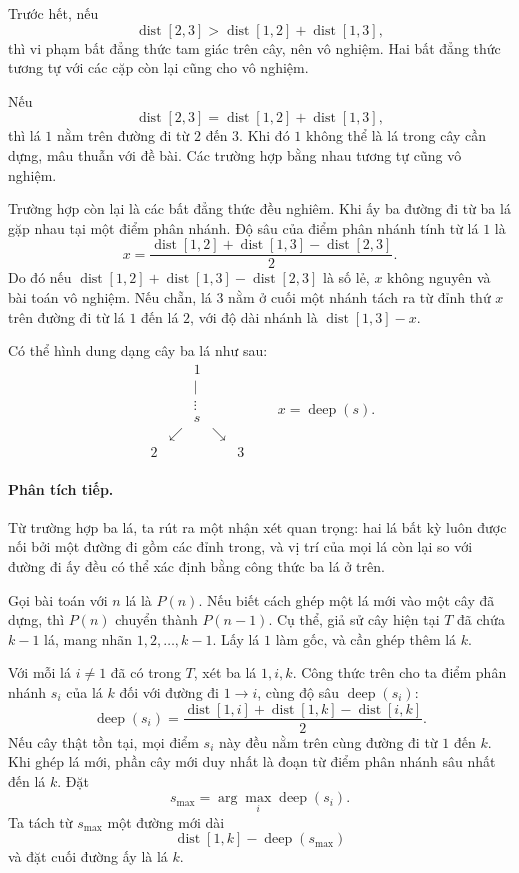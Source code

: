 \documentclass[11pt]{article}
\newcommand{\dist}{\operatorname{dist}}
\newcommand{\deep}{\operatorname{deep}}
\begin{document}
Trước hết, nếu
\[
  \dist[2,3]>\dist[1,2]+\dist[1,3],
\]
thì vi phạm bất đẳng thức tam giác trên cây, nên vô nghiệm. Hai bất đẳng thức
tương tự với các cặp còn lại cũng cho vô nghiệm.

Nếu
\[
  \dist[2,3]=\dist[1,2]+\dist[1,3],
\]
thì lá \(1\) nằm trên đường đi từ \(2\) đến \(3\). Khi đó \(1\) không thể là lá
trong cây cần dựng, mâu thuẫn với đề bài. Các trường hợp bằng nhau tương tự
cũng vô nghiệm.

Trường hợp còn lại là các bất đẳng thức đều nghiêm. Khi ấy ba đường đi từ ba
lá gặp nhau tại một điểm phân nhánh. Độ sâu của điểm phân nhánh tính từ lá
\(1\) là
\[
  x=\frac{\dist[1,2]+\dist[1,3]-\dist[2,3]}{2}.
\]
Do đó nếu \(\dist[1,2]+\dist[1,3]-\dist[2,3]\) là số lẻ, \(x\) không nguyên
và bài toán vô nghiệm. Nếu chẵn, lá \(3\) nằm ở cuối một nhánh tách ra từ
đỉnh thứ \(x\) trên đường đi từ lá \(1\) đến lá \(2\), với độ dài nhánh là
\(\dist[1,3]-x\).

Có thể hình dung dạng cây ba lá như sau:
\[
\begin{array}{ccccc}
&&1&&\\
&&|&&\\
&&\vdots&&\\
&&s&&\\
&\swarrow&&\searrow&\\
2&&&&3
\end{array}
\qquad
x=\deep(s).
\]

\paragraph{Phân tích tiếp.}
Từ trường hợp ba lá, ta rút ra một nhận xét quan trọng: hai lá bất kỳ luôn
được nối bởi một đường đi gồm các đỉnh trong, và vị trí của mọi lá còn lại
so với đường đi ấy đều có thể xác định bằng công thức ba lá ở trên.

Gọi bài toán với \(n\) lá là \(P(n)\). Nếu biết cách ghép một lá mới vào một
cây đã dựng, thì \(P(n)\) chuyển thành \(P(n-1)\). Cụ thể, giả sử cây hiện tại
\(T\) đã chứa \(k-1\) lá, mang nhãn \(1,2,\ldots,k-1\). Lấy lá \(1\) làm gốc,
và cần ghép thêm lá \(k\).

Với mỗi lá \(i\ne 1\) đã có trong \(T\), xét ba lá \(1,i,k\). Công thức trên
cho ta điểm phân nhánh \(s_i\) của lá \(k\) đối với đường đi \(1\to i\), cùng
độ sâu \(\deep(s_i)\):
\[
  \deep(s_i)=
  \frac{\dist[1,i]+\dist[1,k]-\dist[i,k]}{2}.
\]
Nếu cây thật tồn tại, mọi điểm \(s_i\) này đều nằm trên cùng đường đi từ \(1\)
đến \(k\). Khi ghép lá mới, phần cây mới duy nhất là đoạn từ điểm phân nhánh
sâu nhất đến lá \(k\). Đặt
\[
  s_{\max}=\arg\max_i \deep(s_i).
\]
Ta tách từ \(s_{\max}\) một đường mới dài
\[
  \dist[1,k]-\deep(s_{\max})
\]
và đặt cuối đường ấy là lá \(k\).
\end{document}
